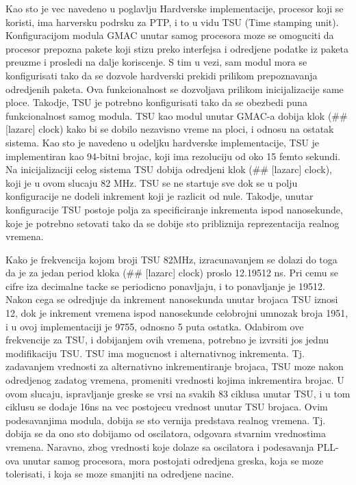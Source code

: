 \documentclass[a4paper,12pt, master]{etf}
\begin{document}
        Kao sto je vec navedeno u poglavlju Hardverske implementacije, procesor koji se koristi, ima harversku
        podrsku za PTP, i to u vidu TSU (Time stamping unit). Konfiguracijom modula GMAC unutar samog procesora
        moze se omoguciti da procesor prepozna pakete koji stizu preko interfejsa i odredjene podatke iz paketa
        preuzme i prosledi na dalje koriscenje. S tim u vezi, sam modul mora se konfigurisati tako da se dozvole
        hardverski prekidi prilikom prepoznavanja odredjenih paketa. Ova funkcionalnost se dozvoljava prilikom
        inicijalizacije same ploce. Takodje, TSU je potrebno konfigurisati tako da se obezbedi puna
        funkcionalnost samog modula. TSU kao modul unutar GMAC-a dobija klok (\#\# [lazarc] clock) kako bi se
        dobilo nezavisno vreme na ploci, i odnosu na ostatak sistema. Kao sto je navedeno u odeljku hardverske
        implementacije, TSU je implementiran kao 94-bitni brojac, koji ima rezoluciju od oko 15 femto sekundi. Na
        inicijalizaciji celog sistema TSU dobija odredjeni klok (\#\# [lazarc] clock), koji je u ovom slucaju 82
        MHz. TSU se ne startuje sve dok se u polju konfiguracije ne dodeli inkrement koji je razlicit od nule.
        Takodje, unutar konfiguracije TSU postoje polja za specificiranje inkrementa ispod nanosekunde, koje je
        potrebno setovati tako da se dobije sto pribliznija reprezentacija realnog vremena.

        Kako je frekvencija kojom broji TSU 82MHz, izracunavanjem se dolazi do toga da je za jedan period kloka
        (\#\# [lazarc] clock) proslo 12.19512 ns. Pri cemu se cifre iza decimalne tacke se periodicno ponavljaju,
        i to ponavljanje je 19512. Nakon cega se odredjuje da inkrement nanosekunda unutar brojaca TSU iznosi 12,
        dok je inkrement vremena ispod nanosekunde celobrojni umnozak broja 1951, i u ovoj implementaciji je 9755,
        odnosno 5 puta ostatka. Odabirom ove frekvencije za TSU, i dobijanjem ovih vremena, potrebno je izvrsiti
        jos jednu modifikaciju TSU\@. TSU ima mogucnost i alternativnog inkrementa. Tj\@. zadavanjem vrednosti za
        alternativno inkrementiranje brojaca, TSU moze nakon odredjenog zadatog vremena, promeniti vrednosti
        kojima inkrementira brojac. U ovom slucaju, ispravljanje greske se vrsi na svakih 83 ciklusa unutar TSU,
        i u tom ciklusu se dodaje 16ns na vec postojecu vrednost unutar TSU brojaca. Ovim podesavanjima modula,
        dobija se sto vernija predstava realnog vremena. Tj\@. dobija se da ono sto dobijamo od oscilatora,
        odgovara stvarnim vrednostima vremena. Naravno, zbog vrednosti koje dolaze sa oscilatora i podesavanja
        PLL-ova unutar samog procesora, mora postojati odredjena greska, koja se moze tolerisati, i koja se moze
        smanjiti na odredjene nacine.
\end{document}
